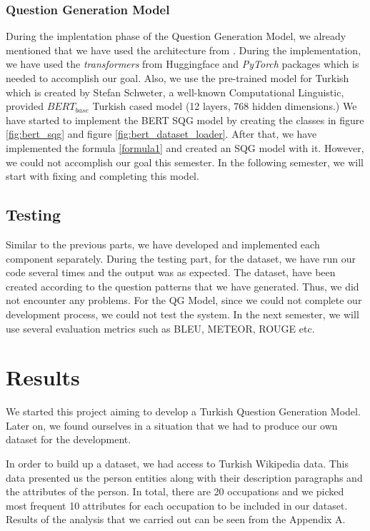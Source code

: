 \documentclass{mefsdp}
\begin{document}
	\subsubsection{Question Generation Model}
	During the implentation phase of the Question Generation Model, we already mentioned that we have used the architecture from \cite{chan-fan-2019-recurrent}. During the implementation, we have used the \textit{transformers} from Huggingface and \textit{PyTorch} packages which is needed to accomplish our goal. Also, we use the pre-trained model for Turkish which is created by Stefan Schweter, a well-known Computational Linguistic, provided $BERT_{base}$ Turkish cased model (12 layers, 768 hidden dimensions.) We have started to implement the BERT SQG model by creating the classes in figure \ref{fig:bert_sqg} and figure \ref{fig:bert_dataset_loader}. After that, we have implemented the formula \ref{formula1} and created an SQG model with it. However, we could not accomplish our goal this semester. In the following semester, we will start with fixing and completing this model.
	
	\subsection{Testing}
	Similar to the previous parts, we have developed and implemented each component separately. During the testing part, for the dataset, we have run our code several times and the output was as expected. The dataset, have been created according to the question patterns that we have generated. Thus, we did not encounter any problems. For the QG Model, since we could not complete our development process, we could not test the system. In the next semester, we will use several evaluation metrics such as BLEU, METEOR, ROUGE etc.
	
	\section{Results}
	We started this project aiming to develop a Turkish Question Generation Model. Later on, we found ourselves in a situation that we had to produce our own dataset for the development. \newline \par
	
	In order to build up a dataset, we had access to Turkish Wikipedia data. This data presented us the person entities along with their description paragraphs and the attributes of the person. In total, there are 20 occupations and we picked most frequent 10 attributes for each occupation to be included in our dataset. Results of the analysis that we carried out can be seen from the Appendix A.\newline \par
	
\end{document}
